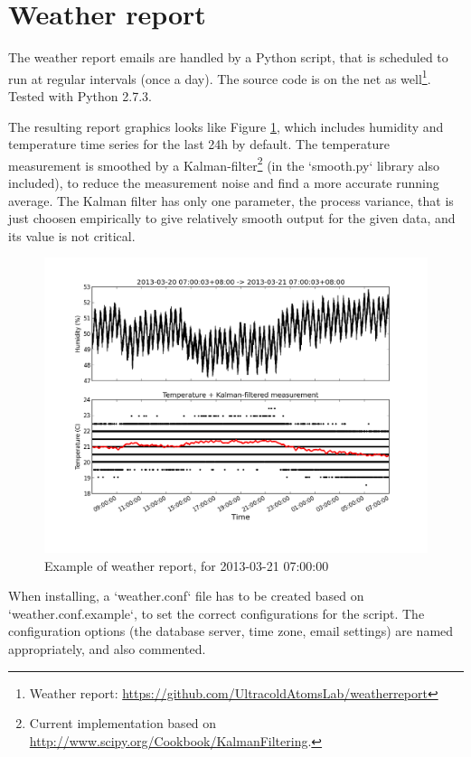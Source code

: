 \documentclass[12pt,a4paper]{article}
\begin{document}
\section{Weather report}

The weather report emails are handled by a Python script, that is scheduled to run at regular intervals (once a day). The source code is on the net as well\footnote{Weather report: \url{https://github.com/UltracoldAtomsLab/weatherreport}}. Tested with Python 2.7.3.

The resulting report graphics looks like Figure \ref{fig:weatherreport}, which includes humidity and temperature time series for the last 24h by default. The temperature measurement is smoothed by a Kalman-filter\footnote{Current implementation based on \url{http://www.scipy.org/Cookbook/KalmanFiltering}.} (in the `smooth.py` library also included), to reduce the measurement noise and find a more accurate running average. The Kalman filter has only one parameter, the process variance, that is just choosen empirically to give relatively smooth output for the given data, and its value is not critical.

\begin{figure}[ht!]
\centering
\includegraphics[width=140mm]{20130321-0700.png}
\caption{Example of weather report, for 2013-03-21 07:00:00}
\label{fig:weatherreport}
\end{figure}

When installing, a `weather.conf` file has to be created based on `weather.conf.example`, to set the correct configurations for the script. The configuration options (the database server, time zone, email settings) are named appropriately, and also commented.
\end{document}
